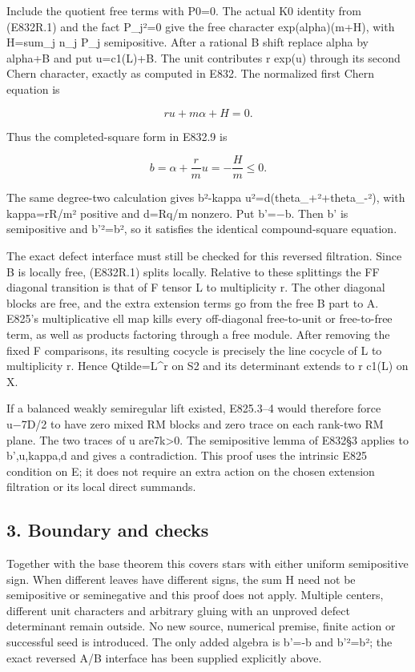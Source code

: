 Include the quotient free terms with P0=0. The actual K0 identity from
(E832R.1) and the fact P\_j²=0 give the free character exp(alpha)(m+H),
with H=sum\_j n\_j P\_j semipositive. After a rational B shift replace
alpha by alpha+B and put u=c1(L)+B. The unit contributes r exp(u)
through its second Chern character, exactly as computed in E832. The
normalized first Chern equation is

\[
 ru+m\alpha+H=0.
 \tag{E832R.3}
\]

Thus the completed-square form in E832.9 is

\[
 b=\alpha+\frac r m u=-\frac{H}{m}\le0.
 \tag{E832R.4}
\]

The same degree-two calculation gives b²-kappa
u²=d(theta\_+²+theta\_-²), with kappa=rR/m² positive and d=Rq/m nonzero.
Put b'=−b. Then b' is semipositive and b'²=b², so it satisfies the
identical compound-square equation.

The exact defect interface must still be checked for this reversed
filtration. Since B is locally free, (E832R.1) splits locally. Relative
to these splittings the FF diagonal transition is that of F tensor L to
multiplicity r. The other diagonal blocks are free, and the extra
extension terms go from the free B part to A. E825's multiplicative ell
map kills every off-diagonal free-to-unit or free-to-free term, as well
as products factoring through a free module. After removing the fixed F
comparisons, its resulting cocycle is precisely the line cocycle of L to
multiplicity r. Hence Qtilde=L\^{}r on S2 and its determinant extends to
r c1(L) on X.

If a balanced weakly semiregular lift existed, E825.3--4 would therefore
force u−7D/2 to have zero mixed RM blocks and zero trace on each
rank-two RM plane. The two traces of u are7k\textgreater0. The
semipositive lemma of E832§3 applies to b',u,kappa,d and gives a
contradiction. This proof uses the intrinsic E825 condition on E; it
does not require an extra action on the chosen extension filtration or
its local direct summands.

\subsection{3. Boundary and checks}\label{SF-E832R:boundary-and-checks}

Together with the base theorem this covers stars with either uniform
semipositive sign. When different leaves have different signs, the sum H
need not be semipositive or seminegative and this proof does not apply.
Multiple centers, different unit characters and arbitrary gluing with an
unproved defect determinant remain outside. No new source, numerical
premise, finite action or successful seed is introduced. The only added
algebra is b'=-b and b'²=b²; the exact reversed A/B interface has been
supplied explicitly above.
